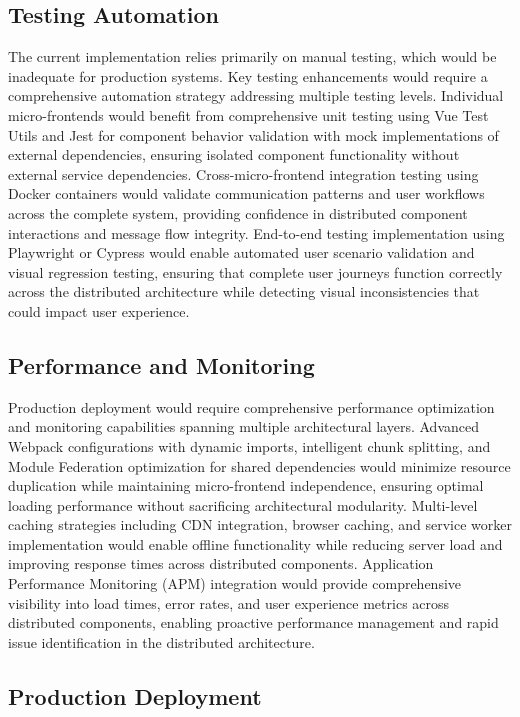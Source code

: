 \documentclass[12pt,a4paper]{report}
\begin{document}
\subsection{Testing Automation}

The current implementation relies primarily on manual testing, which would be inadequate for production systems. Key testing enhancements would require a comprehensive automation strategy addressing multiple testing levels. Individual micro-frontends would benefit from comprehensive unit testing using Vue Test Utils and Jest for component behavior validation with mock implementations of external dependencies, ensuring isolated component functionality without external service dependencies. Cross-micro-frontend integration testing using Docker containers would validate communication patterns and user workflows across the complete system, providing confidence in distributed component interactions and message flow integrity. End-to-end testing implementation using Playwright or Cypress would enable automated user scenario validation and visual regression testing, ensuring that complete user journeys function correctly across the distributed architecture while detecting visual inconsistencies that could impact user experience.

\subsection{Performance and Monitoring}

Production deployment would require comprehensive performance optimization and monitoring capabilities spanning multiple architectural layers. Advanced Webpack configurations with dynamic imports, intelligent chunk splitting, and Module Federation optimization for shared dependencies would minimize resource duplication while maintaining micro-frontend independence, ensuring optimal loading performance without sacrificing architectural modularity. Multi-level caching strategies including CDN integration, browser caching, and service worker implementation would enable offline functionality while reducing server load and improving response times across distributed components. Application Performance Monitoring (APM) integration would provide comprehensive visibility into load times, error rates, and user experience metrics across distributed components, enabling proactive performance management and rapid issue identification in the distributed architecture.

\subsection{Production Deployment}
\end{document}
